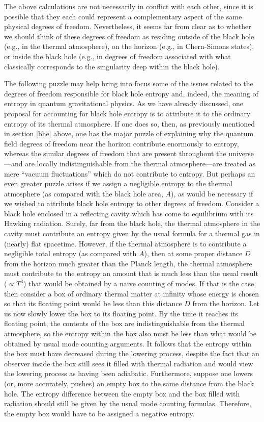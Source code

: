 \documentclass[12pt]{article}
\begin{document}
The above calculations are not necessarily in conflict with each
other, since it is possible that they each could represent a
complementary aspect of the same physical degrees of freedom.
Nevertheless, it seems far from clear as to whether we should think of
these degrees of freedom as residing outside of the black hole (e.g.,
in the thermal atmosphere), on the horizon (e.g., in Chern-Simons
states), or inside the black hole (e.g., in degrees of freedom
associated with what classically corresponds to the singularity deep
within the black hole). 

The following puzzle \cite{w8} may help bring into focus some of the
issues related to the degrees of freedom responsible for black hole
entropy and, indeed, the meaning of entropy in quantum gravitational
physics. As we have already discussed, one proposal for accounting for
black hole entropy is to attribute it to the ordinary entropy of its
thermal atmosphere. If one does so, then, as previously mentioned in
section \ref{bhe} above, one has the major puzzle of explaining why
the quantum field degrees of freedom near the horizon contribute
enormously to entropy, whereas the similar degrees of freedom that are
present throughout the universe---and are locally indistinguishable
from the thermal atmosphere---are treated as mere ``vacuum
fluctuations'' which do not contribute to entropy. But perhaps an even
greater puzzle arises if we assign a negligible entropy to the thermal
atmosphere (as compared with the black hole area, $A$), as would be
necessary if we wished to attribute black hole entropy to other
degrees of freedom.  Consider a black hole enclosed in a reflecting
cavity which has come to equilibrium with its Hawking
radiation. Surely, far from the black hole, the thermal atmosphere in
the cavity must contribute an entropy given by the usual formula for a
thermal gas in (nearly) flat spacetime. However, if the thermal
atmosphere is to contribute a negligible total entropy (as compared
with $A$), then at some proper distance $D$ from the horizon much
greater than the Planck length, the thermal atmosphere must contribute
to the entropy an amount that is much less than the usual result
($\propto T^3$) that would be obtained by a naive counting of
modes. If that is the case, then consider a box of ordinary thermal
matter at infinity whose energy is chosen so that its floating point
would be less than this distance $D$ from the horizon.  Let us now
slowly lower the box to its floating point. By the time it reaches its
floating point, the contents of the box are indistinguishable from the
thermal atmosphere, so the entropy within the box also must be less
than what would be obtained by usual mode counting arguments. It
follows that the entropy within the box must have decreased during the
lowering process, despite the fact that an observer inside the box
still sees it filled with thermal radiation and would view the
lowering process as having been adiabatic. Furthermore, suppose one
lowers (or, more accurately, pushes) an empty box to the same distance
from the black hole. The entropy difference between the empty box and
the box filled with radiation should still be given by the usual mode
counting formulas. Therefore, the empty box would have to be assigned
a negative entropy.
\end{document}
